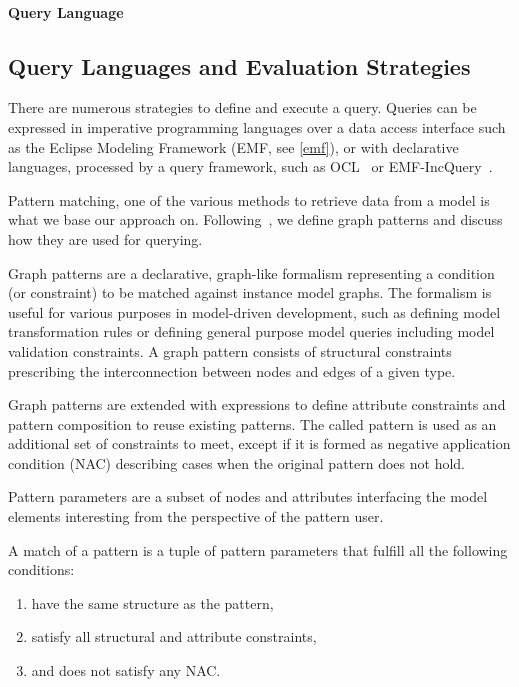 \paragraph{Query Language}



\subsection{Query Languages and Evaluation Strategies}
There are numerous strategies to define and execute a query. Queries can be expressed in imperative programming languages over a data access interface such as the Eclipse Modeling Framework (EMF, see \ref{emf}), or with declarative languages, processed by a query framework, such as OCL~\cite{OCL} or EMF-IncQuery~\cite{IncQuery}.

Pattern matching, one of the various methods to retrieve data from a model is what we base our approach on. Following~\cite{csmr}, we define graph patterns and discuss how they are used for querying.

Graph patterns are a declarative, graph-like formalism representing a
condition (or constraint) to be matched against instance model graphs. The
formalism is useful for various purposes in model-driven development, such as
defining model transformation rules or defining general purpose model queries
including model validation constraints. A graph pattern consists of structural
constraints prescribing the interconnection between nodes and edges of a given
type.

Graph patterns are extended with expressions to define attribute constraints and
pattern composition to reuse existing patterns. The called pattern is used as
an additional set of constraints to meet, except if it is formed as negative
application condition (NAC) describing cases when the original pattern does not hold.

Pattern parameters are a subset of nodes and attributes interfacing the
model elements interesting from the perspective of the pattern user.

A match of a pattern is a tuple of pattern parameters that fulfill all the following conditions:

\begin{enumerate}
	\item have the same structure as the pattern,
	\item satisfy all structural and attribute constraints,
	\item and does not satisfy any NAC.
\end{enumerate}


